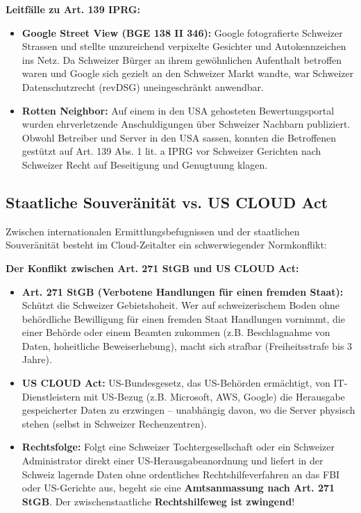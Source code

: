 \begin{example}
    \textbf{Leitfälle zu Art. 139 IPRG:}
    \begin{itemize}
        \item \textbf{Google Street View (BGE 138 II 346):} Google fotografierte Schweizer Strassen und stellte unzureichend verpixelte Gesichter und Autokennzeichen ins Netz. Da Schweizer Bürger an ihrem gewöhnlichen Aufenthalt betroffen waren und Google sich gezielt an den Schweizer Markt wandte, war Schweizer Datenschutzrecht (revDSG) uneingeschränkt anwendbar.
        \item \textbf{Rotten Neighbor:} Auf einem in den USA gehosteten Bewertungsportal wurden ehrverletzende Anschuldigungen über Schweizer Nachbarn publiziert. Obwohl Betreiber und Server in den USA sassen, konnten die Betroffenen gestützt auf Art. 139 Abs. 1 lit. a IPRG vor Schweizer Gerichten nach Schweizer Recht auf Beseitigung und Genugtuung klagen.
    \end{itemize}
\end{example}

\subsection{Staatliche Souveränität vs. US CLOUD Act}

Zwischen internationalen Ermittlungsbefugnissen und der staatlichen Souveränität besteht im Cloud-Zeitalter ein schwerwiegender Normkonflikt:

\begin{definition}
    \textbf{Der Konflikt zwischen Art. 271 StGB und US CLOUD Act:}
    \begin{itemize}
        \item \textbf{Art. 271 StGB (Verbotene Handlungen für einen fremden Staat):} Schützt die Schweizer Gebietshoheit. Wer auf schweizerischem Boden ohne behördliche Bewilligung für einen fremden Staat Handlungen vornimmt, die einer Behörde oder einem Beamten zukommen (z.B. Beschlagnahme von Daten, hoheitliche Beweiserhebung), macht sich strafbar (Freiheitsstrafe bis 3 Jahre).
        \item \textbf{US CLOUD Act:} US-Bundesgesetz, das US-Behörden ermächtigt, von IT-Dienstleistern mit US-Bezug (z.B. Microsoft, AWS, Google) die Herausgabe gespeicherter Daten zu erzwingen -- unabhängig davon, wo die Server physisch stehen (selbst in Schweizer Rechenzentren).
        \item \textbf{Rechtsfolge:} Folgt eine Schweizer Tochtergesellschaft oder ein Schweizer Administrator direkt einer US-Herausgabeanordnung und liefert in der Schweiz lagernde Daten ohne ordentliches Rechtshilfeverfahren an das FBI oder US-Gerichte aus, begeht sie eine \textbf{Amtsanmassung nach Art. 271 StGB}. Der zwischenstaatliche \textbf{Rechtshilfeweg ist zwingend}!
    \end{itemize}
\end{definition}

